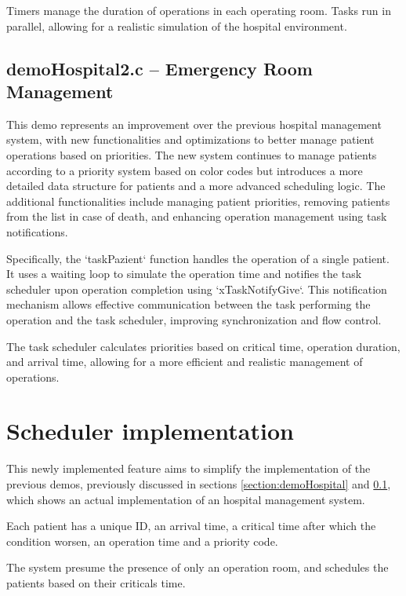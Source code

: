 \documentclass[a4paper, 10pt, oneside]{article} %
\begin{document}
Timers manage the duration of operations in each operating room. Tasks run in parallel, allowing for a realistic simulation of the hospital environment.

\subsection{demoHospital2.c -- Emergency Room Management}
\label{section:demoHospital2}

This demo represents an improvement over the previous hospital management system, with new functionalities and optimizations to better manage patient operations based on priorities. The new system continues to manage patients according to a priority system based on color codes but introduces a more detailed data structure for patients and a more advanced scheduling logic. The additional functionalities include managing patient priorities, removing patients from the list in case of death, and enhancing operation management using task notifications.

Specifically, the `taskPazient` function handles the operation of a single patient. It uses a waiting loop to simulate the operation time and notifies the task scheduler upon operation completion using `xTaskNotifyGive`. This notification mechanism allows effective communication between the task performing the operation and the task scheduler, improving synchronization and flow control.

The task scheduler calculates priorities based on critical time, operation duration, and arrival time, allowing for a more efficient and realistic management of operations.

\section{Scheduler implementation}
This newly implemented feature aims to simplify the implementation of the previous demos, previously discussed in sections \ref{section:demoHospital} and \ref{section:demoHospital2}, which shows an actual implementation of an hospital management system.

Each patient has a unique ID, an arrival time, a critical time after which the condition worsen, an operation time and a priority code.

The system presume the presence of only an operation room, and schedules the patients based on their criticals time.

\end{document}
